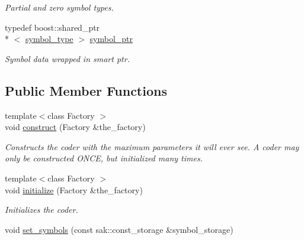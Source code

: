 \begin{DoxyCompactItemize}
\begin{DoxyCompactList}\small\item\em Partial and zero symbol types. \end{DoxyCompactList}\item 
\hypertarget{classkodo_1_1partial__shallow__symbol__storage_acee6b5408cfc5bd21794e750bc3d9950}{typedef boost\-::shared\-\_\-ptr\\*
$<$ \hyperlink{classkodo_1_1partial__shallow__symbol__storage_a491e576e9bbf42a70802d3e0cc694551}{symbol\-\_\-type} $>$ \hyperlink{classkodo_1_1partial__shallow__symbol__storage_acee6b5408cfc5bd21794e750bc3d9950}{symbol\-\_\-ptr}}\label{classkodo_1_1partial__shallow__symbol__storage_acee6b5408cfc5bd21794e750bc3d9950}

\begin{DoxyCompactList}\small\item\em Symbol data wrapped in smart ptr. \end{DoxyCompactList}\end{DoxyCompactItemize}
\subsection*{Public Member Functions}
\begin{DoxyCompactItemize}
\item 
{\footnotesize template$<$class Factory $>$ }\\void \hyperlink{classkodo_1_1partial__shallow__symbol__storage_a9353c4e8b6143730edf6b1de816daaba}{construct} (Factory \&the\-\_\-factory)
\begin{DoxyCompactList}\small\item\em Constructs the coder with the maximum parameters it will ever see. A coder may only be constructed O\-N\-C\-E, but initialized many times. \end{DoxyCompactList}\item 
{\footnotesize template$<$class Factory $>$ }\\void \hyperlink{classkodo_1_1partial__shallow__symbol__storage_a697666dcb9b3c5670043bd1006b5bfc7}{initialize} (Factory \&the\-\_\-factory)
\begin{DoxyCompactList}\small\item\em Initializes the coder. \end{DoxyCompactList}\item 
void \hyperlink{classkodo_1_1partial__shallow__symbol__storage_a4be20580887f1d0f03fb50414a9d9cc6}{set\-\_\-symbols} (const sak\-::const\-\_\-storage \&symbol\-\_\-storage)
\begin{DoxyCompactList}\small\item\em \end{DoxyCompactList}\end{DoxyCompactItemize}
